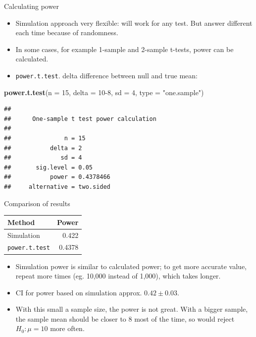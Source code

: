 \documentclass[ignorenonframetext,]{beamer}
\newenvironment{Shaded}{\begin{snugshade}}{\end{snugshade}}
\newcommand{\DataTypeTok}[1]{\textcolor[rgb]{0.13,0.29,0.53}{#1}}
\newcommand{\DecValTok}[1]{\textcolor[rgb]{0.00,0.00,0.81}{#1}}
\newcommand{\KeywordTok}[1]{\textcolor[rgb]{0.13,0.29,0.53}{\textbf{#1}}}
\newcommand{\NormalTok}[1]{#1}
\newcommand{\StringTok}[1]{\textcolor[rgb]{0.31,0.60,0.02}{#1}}
\providecommand{\tightlist}{%
  \setlength{\itemsep}{0pt}\setlength{\parskip}{0pt}}
\begin{document}
\begin{frame}[fragile]{Calculating power}
\protect\hypertarget{calculating-power}{}

\begin{itemize}
\tightlist
\item
  Simulation approach very flexible: will work for any test. But answer
  different each time because of randomness.
\item
  In some cases, for example 1-sample and 2-sample t-tests, power can be
  calculated.
\item
  \texttt{power.t.test}. delta difference between null and true mean:
\end{itemize}

\small

\begin{Shaded}
\begin{Highlighting}[]
\KeywordTok{power.t.test}\NormalTok{(}\DataTypeTok{n =} \DecValTok{15}\NormalTok{, }\DataTypeTok{delta =} \DecValTok{10-8}\NormalTok{, }\DataTypeTok{sd =} \DecValTok{4}\NormalTok{, }\DataTypeTok{type =} \StringTok{"one.sample"}\NormalTok{)}
\end{Highlighting}
\end{Shaded}

\begin{verbatim}
## 
##      One-sample t test power calculation 
## 
##               n = 15
##           delta = 2
##              sd = 4
##       sig.level = 0.05
##           power = 0.4378466
##     alternative = two.sided
\end{verbatim}

\normalsize

\end{frame}

\begin{frame}{Comparison of results}
\protect\hypertarget{comparison-of-results}{}

\begin{center}
  \begin{tabular}{lr}
    Method & Power\\
    \hline
    Simulation & 0.422\\
    \texttt{power.t.test} & 0.4378\\
    \hline
  \end{tabular}
    
  \end{center}

\begin{itemize}
\tightlist
\item
  Simulation power is similar to calculated power; to get more accurate
  value, repeat more times (eg. 10,000 instead of 1,000), which takes
  longer.
\item
  CI for power based on simulation approx. \(0.42 \pm 0.03\).
\item
  With this small a sample size, the power is not great. With a bigger
  sample, the sample mean should be closer to 8 most of the time, so
  would reject \(H_0 : \mu = 10\) more often.
\end{itemize}

\end{frame}
\end{document}
